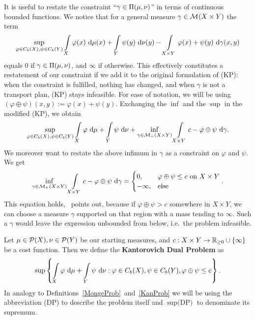 It is useful to restate the constraint ``$\gamma \in \TP{\mu}{\nu}$'' in terms of continuous bounded functions. We notice that for a general measure $\gamma \in \M{X \times Y}$ the term
\[ \sup\limits_{\varphi \in \CF[b]{X}, \psi \in \CF[b]{Y}} \int\limits_X \varphi(x)~\Dx{\mu} + \int\limits_Y \psi(y)~\Dx[y]{\nu} - \int\limits_{X \times Y} \varphi(x) + \psi(y)~\Dx[x, y]{\gamma} \]
equals $0$ if $\gamma \in \TP{\mu}{\nu}$, and $\infty$ if otherwise. This effectively constitutes a restatement of our constraint if we add it to the original formulation of (KP): when the constraint is fulfilled, nothing has changed, and when $\gamma$ is not a transport plan, (KP) stays infeasible. For ease of notation, we will be using $(\varphi \oplus \psi)(x, y) := \varphi(x) + \psi(y)$. Exchanging the $\inf$ and the $\sup$ in the modified (KP), we obtain
\[ \sup\limits_{\varphi \in \CF[b]{X}, \psi \in \CF[b]{Y}} \int\limits_{X} \varphi~\D + \int\limits_{Y} \psi~\D[\nu] + \inf\limits_{\gamma \in \M[+]{X \times Y}} \int\limits_{X \times Y} c - \varphi \oplus \psi~\D[\gamma]. \]
We moreover want to restate the above infimum in $\gamma$ as a constraint on $\varphi$ and $\psi$. We get
\[ \inf\limits_{\gamma \in \M[+]{X \times Y}} \int\limits_{X \times Y} c - \varphi \oplus \psi~\D[\gamma] = 
\begin{cases}
	0, & \varphi \oplus \psi \le c \text{ on } X \times Y \\
	- \infty, & \text{else}
\end{cases}. \]
This equation holds,\ \cite{San2015} points out, because if $\varphi \oplus \psi > c$ somewhere in $X \times Y$, we can choose a measure $\gamma$ supported on that region with a mass tending to $\infty$. Such a $\gamma$ would leave the expression unbounded from below, i.e.\ the problem infeasible.

\begin{definition}\label{DualProb}
	Let $\mu \in \PM{X}, \nu \in \PM{Y}$ be our starting measures, and $\map[c]{X \times Y}{\RZero{} \cup{} \{ \infty \}}$ be a cost function. Then we define the \textbf{Kantorovich Dual Problem} as
	\begin{equation}\label{DPEq}
		\sup \left\{ \int\limits_{X} \varphi~\D + \int\limits_{Y} \psi~\D[\nu] : \varphi \in \CF[b]{X}, \psi \in \CF[b]{Y}, \varphi \oplus \psi \le c \right\}.
	\end{equation}
	In analogy to Definitions~\ref{MongeProb}~and~\ref{KanProb} we will be using the abbreviation (DP) to describe the problem itself and $\sup \text{(DP)}$ to denominate its supremum.
\end{definition}

